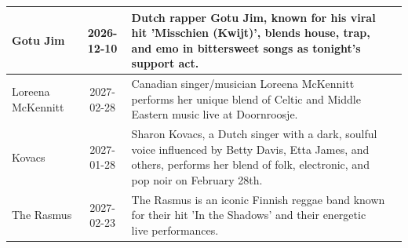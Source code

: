 \begin{center}
\begin{longtable}{p{3cm}cp{7cm}p{3cm}}
\midrule
Gotu Jim & 2026-12-10 & Dutch rapper Gotu Jim, known for his viral hit 'Misschien (Kwijt)', blends house, trap, and emo in bittersweet songs as tonight's support act. \\
\midrule
Loreena McKennitt & 2027-02-28 & Canadian singer/musician Loreena McKennitt performs her unique blend of Celtic and Middle Eastern music live at Doornroosje. \\
\midrule
Kovacs & 2027-01-28 & Sharon Kovacs, a Dutch singer with a dark, soulful voice influenced by Betty Davis, Etta James, and others, performs her blend of folk, electronic, and pop noir on February 28th. \\
\midrule
The Rasmus & 2027-02-23 & The Rasmus is an iconic Finnish reggae band known for their hit 'In the Shadows' and their energetic live performances. \\
\bottomrule
\end{longtable}
\end{center}
